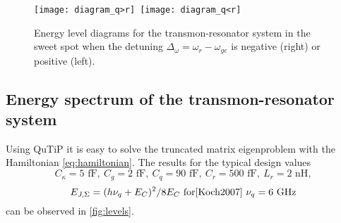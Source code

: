 \documentclass[12pt, twoside]{report}
\numberwithin{equation}{section}
\begin{document}
\begin{figure}[h]
\centering
\texttt{[image: diagram\_q>r]}\ \texttt{[image: diagram\_q<r]}
\caption{Energy level diagrams for the transmon-resonator system in the sweet spot when the detuning $\Delta_\omega = \omega_r-\omega_{ge}$ is negative (right) or positive (left).}
\label{fig:diagram}
\end{figure}

\subsection{Energy spectrum of the transmon-resonator system}

Using QuTiP\cite{Johansson2011} it is easy to solve the truncated matrix eigenproblem with the Hamiltonian \eqref{eq:hamiltonian}. The results for the typical design values
$$
C_\kappa = 5 \text{ fF},\ C_g = 2 \text{ fF},\ C_q = 90 \text{ fF},\ C_r = 500 \text{ fF},\ L_r = 2 \text{ nH}, $$
$$E_{J, \Sigma} = (h \nu_q + E_C)^2/8 E_C\ \text{for\cite{Koch2007}}\ \nu_q = 6\ \text{GHz}
$$
can be observed in \autoref{fig:levels}.
\end{document}

